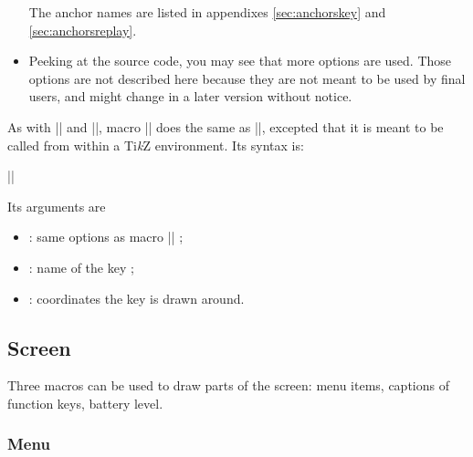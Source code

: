 \documentclass{ltxdoc}
\newcommand{\TikZ}{Ti\emph{k}Z}
\begin{document}
\begin{itemize}
\begin{center}
 \end{center}
 The anchor names are listed in appendixes \ref{sec:anchorskey} and \ref{sec:anchorsreplay}.
 \item Peeking at the source code, you may see that more options are used. Those options are not described here because they are not meant to be used by final users, and might change in a later version without notice.
 \end{itemize}

 \DescribeMacro{\tikzkey}
 As with |\calculator| and |\tikzcalculator|, macro |\tikzkey| does the same as |\key|, excepted that it is meant to be called from within a \TikZ{} environment. Its syntax is:
 \begin{center}
 |\tikzkey|
 \end{center}

 Its arguments are
 \begin{itemize}
 \item {}: same options as macro |\key| ;
 \item {}: name of the key ;
 \item {}: coordinates the key is drawn around.
 \end{itemize}

 \subsection{Screen}

 Three macros can be used to draw parts of the screen: menu items, captions of function keys, battery level.

 \subsubsection{Menu}
\end{document}
